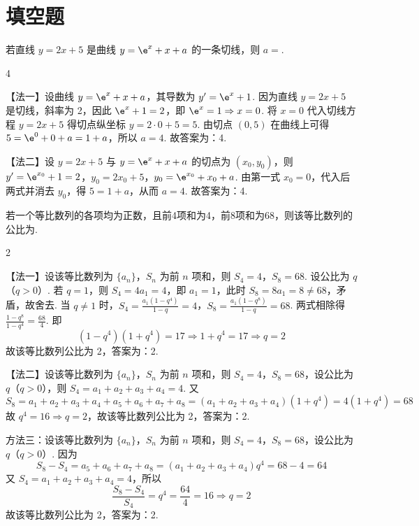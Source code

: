 \documentclass[UTF8,a4paper,oneside,11pt]{ctexbook}
\begin{document}
\section{填空题}

\begin{problem}
若直线 \(y = 2x + 5\) 是曲线 \(y = \e^x + x + a\) 的一条切线，则 \(a =\)\fillinblank{}.
\end{problem}

\begin{answer}
4
\end{answer}

\begin{solution}
【法一】设曲线 \(y = \e^x + x + a\)，其导数为
\(y'=\e^x+1\). 因为直线 \(y = 2x + 5\) 是切线，斜率为 2，因此 \(\e^x+1=2\)，即 \(\e^x=1 \Rightarrow x=0\). 将 \(x=0\) 代入切线方程 \(y=2x+5\) 得切点纵坐标 \(y=2\cdot 0+5=5\). 由切点 \((0,5)\) 在曲线上可得 \(5=\e^0+0+a=1+a\)，所以 \(a=4\). 故答案为：4.

【法二】设 \(y=2x+5\) 与 \(y=\e^x+x+a\) 的切点为 \((x_0,y_0)\)，则
\(y' = \e^{x_0}+1=2\)，\(y_0 = 2x_0+5\)，\(y_0 = \e^{x_0}+x_0+a\).
由第一式 \(x_0=0\)，代入后两式并消去 \(y_0\)，得 \(5=1+a\)，从而
\(a=4\).
故答案为：4.
\end{solution}

\begin{problem}
若一个等比数列的各项均为正数，且前4项和为4，前8项和为68，则该等比数列的公比为\fillinblank{}.
\end{problem}

\begin{answer}
2
\end{answer}

\begin{solution}
【法一】设该等比数列为 \(\{a_n\}\)，\(S_n\) 为前 \(n\) 项和，则 \(S_4=4\)，\(S_8=68\). 设公比为 \(q\)（\(q>0\)）.
若 \(q=1\)，则 \(S_4=4a_1=4\)，即 \(a_1=1\)，此时 \(S_8=8a_1=8\neq68\)，矛盾，故舍去. 当 \(q\neq1\) 时，\(S_4 = \frac{a_1(1-q^4)}{1-q}=4\)，\(S_8 = \frac{a_1(1-q^8)}{1-q}=68\). 两式相除得 \(\frac{1-q^8}{1-q^4}=\frac{68}{4}\). 即
\[
(1-q^4)(1+q^4)=17 \Rightarrow 1+q^4=17 \Rightarrow q=2
\]
故该等比数列公比为 2，答案为：2.

【法二】设该等比数列为 \(\{a_n\}\)，\(S_n\) 为前 \(n\) 项和，则 \(S_4=4\)，\(S_8=68\)，设公比为 \(q\)（\(q>0\)），则 \(S_4=a_1+a_2+a_3+a_4=4\). 又
\[
S_8=a_1+a_2+a_3+a_4+a_5+a_6+a_7+a_8=(a_1+a_2+a_3+a_4)(1+q^4)=4(1+q^4)=68
\]
故 \(q^4=16 \Rightarrow q=2\)，故该等比数列公比为 2，答案为：2.

方法三：设该等比数列为 \(\{a_n\}\)，\(S_n\) 为前 \(n\) 项和，则 \(S_4=4\)，\(S_8=68\)，设公比为 \(q\)（\(q>0\)）. 因为
\[
S_8-S_4=a_5+a_6+a_7+a_8=(a_1+a_2+a_3+a_4)q^4=68-4=64
\]
又 \(S_4=a_1+a_2+a_3+a_4=4\)，所以
\[
\frac{S_8-S_4}{S_4}=q^4=\frac{64}{4}=16 \Rightarrow q=2
\]
故该等比数列公比为 2，答案为：2.
\end{solution}
\end{document}
